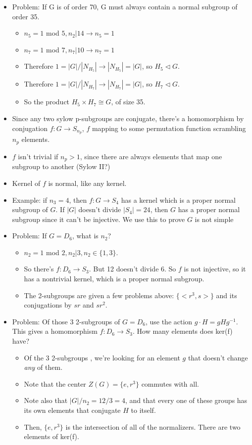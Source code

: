 \documentclass[11pt, oneside]{article}   	%
\begin{document}
\begin{itemize}
\item Problem: If G is of order 70, G must always contain a normal subgroup of order 35.
\begin{itemize}
\item $n_ 5= 1 $ mod $ 5, n_2 | 14 \rightarrow n_5 = 1$
\item $n_ 7= 1 $ mod $ 7, n_7 | 10 \rightarrow n_7 = 1$
\item Therefore $1 = |G| / |N_{H_5}| \rightarrow |N_{H_5}|  = |G|$, so $ H_5 \triangleleft G$.
\item Therefore $1 = |G| / |N_{H_7}| \rightarrow |N_{H_7}|  = |G|$, so $ H_7 \triangleleft G$.
\item So the product $H_5 \times H_7 \cong G$, of size 35.
\end{itemize}

\item Since any two sylow p-subgroups are conjugate, there's a homomorphism by conjugation $f: G \rightarrow S_{n_p}$, $f$ mapping to some permutation function scrambling $n_p$ elements.
\item $f$ isn't trivial if $n_p > 1$, since there are always elements that map one subgroup to another (Sylow II?)
\item Kernel of $f$ is normal, like any kernel.
\item Example: if $n_3 = 4$, then $f: G \rightarrow S_4$ has a kernel which is a proper normal subgroup of $G$.  If $|G|$ doesn't divide $|S_4| = 24$, then $G$ has a proper normal subgroup since it can't be injective.  We use this to prove $G$ is not simple

\item Problem: If $G = D_6$, what is $n_2$?
\begin{itemize}
\item $n_2 = 1 $ mod $ 2, n_2 | 3, n_2 \in \{1, 3\}$.
\item So there's $f: D_6 \rightarrow S_3$.  But 12 doesn't divide 6.  So $f$ is not injective, so it has a nontrivial kernel, which is a proper normal subgroup.
\item The 2-subgroups are given a few problems above: $\{<r^3, s>\}$ and its conjugations by $sr$ and $sr^2$.
\end{itemize}

\item Problem: Of those 3 2-subgroups of $G = D_6$, use the action $g \cdot H = gHg^{-1}$.  This gives a homomorphism $f: D_6 \rightarrow S_3$.  How many elements does ker(f) have?
\begin{itemize}
\item Of the 3 2-subgroups , we're looking for an element $g$ that doesn't change \emph{any} of them.
\item Note that the center $Z(G) = \{e, r^3\}$ commutes with all.
\item Note also that $|G| / n_2 = 12 / 3 = 4$, and that every one of these groups has its own elements that conjugate $H$ to itself.
\item Then, $\{e, r^3\}$ is the intersection of all of the normalizers.  There are two elements of ker(f).
\end{itemize}


\end{itemize}
\end{document}
